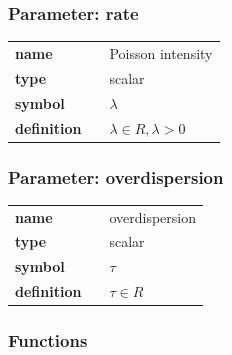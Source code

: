 \subsubsection*{Parameter: rate}

\noindent\begin{tabular}{p{2cm}cl}
\textbf{name} & & Poisson intensity \\
\textbf{type} & & scalar \\
\textbf{symbol} & & $\lambda$  \\
\textbf{definition} & & $\lambda \in R, \lambda > 0$
\end{tabular}
\subsubsection*{Parameter: overdispersion}

\noindent\begin{tabular}{p{2cm}cl}
\textbf{name} & & overdispersion \\
\textbf{type} & & scalar \\
\textbf{symbol} & & $\tau$  \\
\textbf{definition} & & $\tau \in R$
\end{tabular}
\subsubsection*{Functions}

